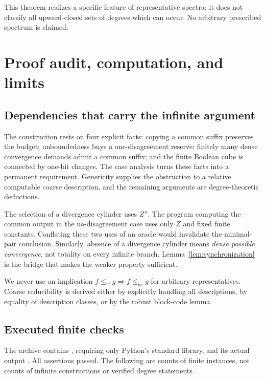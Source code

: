\documentclass[11pt,a4paper]{article}
\newcommand{\leT}{\leq_{\mathrm T}}
\newcommand{\nc}{\mathrm{nc}}
\theoremstyle{definition}\newtheorem{definition}[theorem]{Definition}
\theoremstyle{remark}\newtheorem{remark}[theorem]{Remark}
\begin{document}
This theorem realizes a specific feature of representative spectra; it does not classify all upward-closed sets of degrees which can occur. No arbitrary prescribed spectrum is claimed.

\section{Proof audit, computation, and limits}
\label{sec:audit}

\subsection{Dependencies that carry the infinite argument}
The construction rests on four explicit facts: copying a common suffix preserves the budget; unboundedness buys a one-disagreement reserve; finitely many dense convergence demands admit a common suffix; and the finite Boolean cube is connected by one-bit changes. The case analysis turns these facts into a permanent requirement. Genericity supplies the obstruction to a relative computable coarse description, and the remaining arguments are degree-theoretic deductions.

The selection of a divergence cylinder uses $Z''$. The program computing the common output in the no-disagreement case uses only $Z$ and fixed finite constants. Conflating these two uses of an oracle would invalidate the minimal-pair conclusion. Similarly, absence of a divergence cylinder means \emph{dense possible convergence}, not totality on every infinite branch. Lemma~\ref{lem:synchronization} is the bridge that makes the weaker property sufficient.

We never use an implication $f\leT g\Rightarrow f\le_\nc g$ for arbitrary representatives. Coarse reducibility is derived either by explicitly handling all descriptions, by equality of description classes, or by the robust block-code lemma.

\subsection{Executed finite checks}
The archive contains , requiring only Python's standard library, and its actual output . All assertions passed. The following are counts of finite instances, not counts of infinite constructions or verified degree statements.
\end{document}
